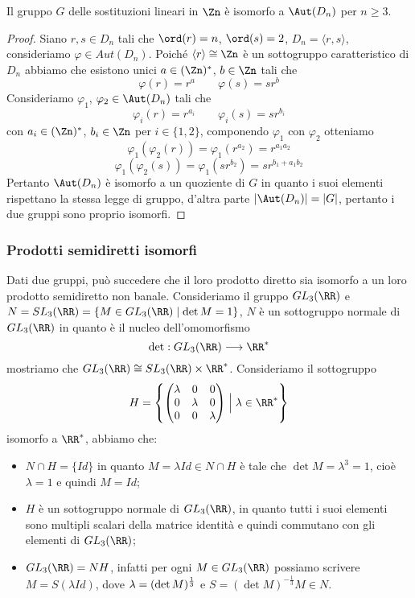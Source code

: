 \documentclass[11pt]{scrartcl}
\begin{document}
\begin{proposition}
    Il gruppo $G$ delle sostituzioni lineari in $\Zn$ è isomorfo a $\Aut(D_n)$
    per $n \geq 3$.
\end{proposition}

\begin{proof}
    Siano $r, s \in D_n$ tali che $\ord(r) = n$, $\ord(s) = 2$, $D_n = \langle r, s\rangle$,
    consideriamo $\varphi \in Aut(D_n)$. Poiché $\langle r\rangle \cong \Zn$ è un 
    sottogruppo caratteristico di $D_n$ abbiamo che esistono unici $a \in (\Zn)^*$,
    $b \in \Zn$ tali che 
    \[
        \varphi(r) = r^a\qquad \varphi(s) = sr^b
    \]
    Consideriamo $\varphi_1$, $\varphi_2 \in \Aut(D_n)$ tali che
    \[
        \varphi_i(r) = r^{a_i} \qquad \varphi_i(s) = sr^{b_i}
    \]
    con $a_i \in (\Zn)^*$, $b_i \in \Zn$ per $i \in \{1, 2\}$, componendo
    $\varphi_1$ con $\varphi_2$ otteniamo
    \[
        \varphi_1(\varphi_2(r)) = \varphi_1(r^{a_2}) = r^{a_1a_2}
    \]
    \[
        \varphi_1(\varphi_2(s)) = \varphi_1(sr^{b_2}) = sr^{b_1 + a_1b_2}
    \]
    Pertanto $\Aut(D_n)$ è isomorfo a un quoziente di $G$ in quanto i suoi
    elementi rispettano la stessa legge di gruppo, d'altra parte $|\Aut(D_n)| = |G|$,
    pertanto i due gruppi sono proprio isomorfi.
\end{proof}

\subsubsection{Prodotti semidiretti isomorfi}

Dati due gruppi, può succedere che il loro prodotto diretto sia isomorfo a 
un loro prodotto semidiretto non banale.\newline
Consideriamo il gruppo $GL_3(\RR)$ e $N = SL_3(\RR) = \{M \in GL_3(\RR)
\mid \det M = 1\}$, $N$ è un sottogruppo normale di $GL_3(\RR)$ in quanto è il nucleo
dell'omomorfismo
\[
    \det: GL_3(\RR) \longrightarrow \RR^*
\]
mostriamo che $GL_3(\RR) \cong SL_3(\RR)\times\RR^*$. Consideriamo il sottogruppo
\[
    H = \left\{\begin{pmatrix}
    \lambda & 0 & 0\\
    0 & \lambda & 0\\
    0 & 0 & \lambda
    \end{pmatrix}\Bigm| \lambda \in \RR^* \right\}
\]isomorfo a $\RR^*$, abbiamo che:

\begin{itemize}
    \item $N \cap H = \{Id\}$ in quanto $M = \lambda Id \in N\cap H$ è tale
    che $\det M = \lambda^3 = 1$, cioè $\lambda = 1$ e quindi $M = Id$;
    \item $H$ è un sottogruppo normale di $GL_3(\RR)$, in quanto tutti i suoi elementi
    sono multipli scalari della matrice identità e quindi commutano con gli
    elementi di $GL_3(\RR)$;
    \item $GL_3(\RR) = NH$, infatti per ogni $M \in GL_3(\RR)$ possiamo scrivere $M = S(\lambda Id)$,
    dove $\lambda = \nolinebreak(\det M)^{\frac 1 3}$ e $S = (\det M)^{-\frac 1 3} M \in N$.
\end{itemize}
\end{document}
